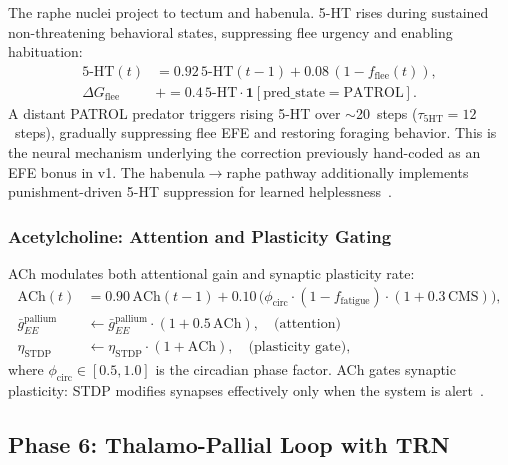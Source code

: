 \documentclass[11pt,a4paper]{article}
\begin{document}
The raphe nuclei project to tectum and habenula.
5-HT rises during sustained non-threatening behavioral states,
suppressing flee urgency and enabling habituation:
\begin{equation}\label{eq:serotonin}
\begin{aligned}
  \mathrm{5\text{-}HT}(t) &= 0.92\,\mathrm{5\text{-}HT}(t{-}1)
    + 0.08\,(1 - f_\mathrm{flee}(t)), \\
  \Delta G_\mathrm{flee} &\mathrel{+}= 0.4\,\mathrm{5\text{-}HT} \cdot
    \mathbf{1}[\mathrm{pred\_state} = \mathrm{PATROL}].
\end{aligned}
\end{equation}
A distant PATROL predator triggers rising 5-HT over $\sim$20~steps
($\tau_\mathrm{5HT} = 12$~steps), gradually suppressing flee EFE and
restoring foraging behavior.
This is the neural mechanism underlying the correction previously
hand-coded as an EFE bonus in v1.
The habenula$\to$raphe pathway additionally implements
punishment-driven 5-HT suppression for learned helplessness~\cite{amo2014}.

\subsubsection{Acetylcholine: Attention and Plasticity Gating}

ACh modulates both attentional gain and synaptic plasticity rate:
\begin{equation}\label{eq:ach}
\begin{aligned}
  \mathrm{ACh}(t) &= 0.90\,\mathrm{ACh}(t{-}1)
    + 0.10\,\bigl(\phi_\mathrm{circ} \cdot (1-f_\mathrm{fatigue})
    \cdot (1 + 0.3\,\mathrm{CMS})\bigr), \\
  \bar{g}_{EE}^\mathrm{pallium} &\leftarrow
    \bar{g}_{EE}^\mathrm{pallium} \cdot (1 + 0.5\,\mathrm{ACh}),
    \quad\text{(attention)} \\
  \eta_\mathrm{STDP} &\leftarrow \eta_\mathrm{STDP} \cdot (1 + \mathrm{ACh}),
    \quad\text{(plasticity gate)},
\end{aligned}
\end{equation}
where $\phi_\mathrm{circ} \in [0.5, 1.0]$ is the circadian phase factor.
ACh gates synaptic plasticity: STDP modifies synapses effectively only
when the system is alert~\cite{kirkwood1999}.

\subsection{Phase 6: Thalamo-Pallial Loop with TRN}\label{sec:phase6}
\end{document}
